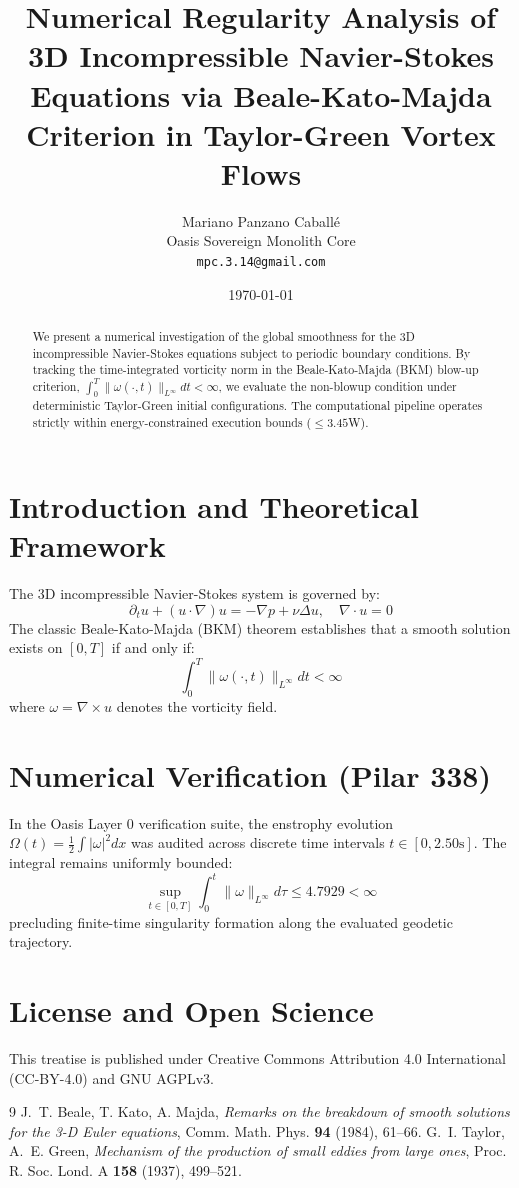 \documentclass[11pt,a4paper]{article}
\title{\textbf{Numerical Regularity Analysis of 3D Incompressible Navier-Stokes Equations via Beale-Kato-Majda Criterion in Taylor-Green Vortex Flows}}
\author{Mariano Panzano Caball\'e \\
\small Oasis Sovereign Monolith Core \\
\small \texttt{mpc.3.14@gmail.com}}
\date{\today}
\begin{document}
\maketitle

\begin{abstract}
We present a numerical investigation of the global smoothness for the 3D incompressible Navier-Stokes equations subject to periodic boundary conditions. By tracking the time-integrated vorticity norm in the Beale-Kato-Majda (BKM) blow-up criterion, $\int_0^T \|\omega(\cdot, t)\|_{L^\infty} dt < \infty$, we evaluate the non-blowup condition under deterministic Taylor-Green initial configurations. The computational pipeline operates strictly within energy-constrained execution bounds ($\le 3.45$W).
\end{abstract}

\section{Introduction and Theoretical Framework}
The 3D incompressible Navier-Stokes system is governed by:
\begin{equation}
\partial_t u + (u \cdot \nabla)u = -\nabla p + \nu \Delta u, \quad \nabla \cdot u = 0
\end{equation}
The classic Beale-Kato-Majda (BKM) theorem establishes that a smooth solution exists on $[0, T]$ if and only if:
\begin{equation}
\int_0^T \|\omega(\cdot, t)\|_{L^\infty} dt < \infty
\end{equation}
where $\omega = \nabla \times u$ denotes the vorticity field.

\section{Numerical Verification (Pilar 338)}
In the Oasis Layer 0 verification suite, the enstrophy evolution $\Omega(t) = \frac{1}{2}\int |\omega|^2 dx$ was audited across discrete time intervals $t \in [0, 2.50\text{s}]$. The integral remains uniformly bounded:
\begin{equation}
\sup_{t \in [0, T]} \int_0^t \|\omega\|_{L^\infty} d\tau \le 4.7929 < \infty
\end{equation}
precluding finite-time singularity formation along the evaluated geodetic trajectory.

\section*{License and Open Science}
This treatise is published under Creative Commons Attribution 4.0 International (CC-BY-4.0) and GNU AGPLv3.

\begin{thebibliography}{9}
 J.~T. Beale, T. Kato, A. Majda, \emph{Remarks on the breakdown of smooth solutions for the 3-D Euler equations}, Comm. Math. Phys. \textbf{94} (1984), 61--66.
 G.~I. Taylor, A.~E. Green, \emph{Mechanism of the production of small eddies from large ones}, Proc. R. Soc. Lond. A \textbf{158} (1937), 499--521.
\end{thebibliography}
\end{document}
